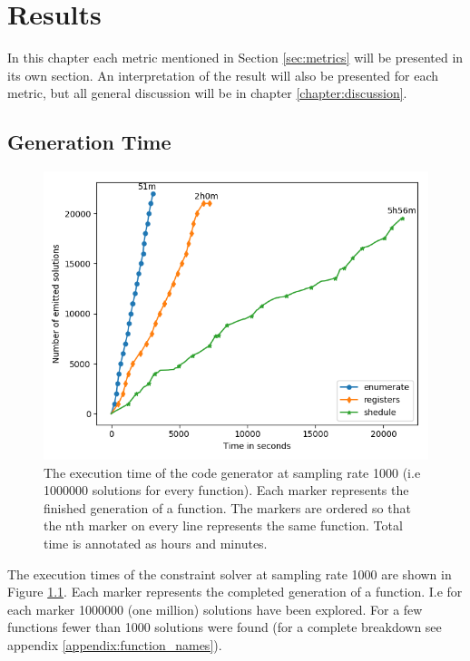 \chapter{Results}

In this chapter each metric mentioned in Section \ref{sec:metrics} will be presented in
its own section. An interpretation of the result will also be presented for each
metric, but all general discussion will be in chapter \ref{chapter:discussion}.

\section{Generation Time}

\begin{figure}[h]
	\centering
	\includegraphics[width=\textwidth,height=0.5\textheight]{results/figures/generator_time}
	\caption{The execution time of the code generator at sampling rate 1000 (i.e 1000000 solutions for every function). Each marker represents the finished generation of a function. The markers are ordered so that the nth marker on every line represents the same function. Total time is annotated as hours and minutes.}
	\label{fig:time}
\end{figure}

The execution times of the constraint solver at sampling rate 1000 are shown in Figure
\ref{fig:time}. Each marker represents the completed generation of a function. I.e for each
marker 1000000 (one million) solutions have been explored. For a few functions fewer than
1000 solutions were found (for a complete breakdown see appendix \ref{appendix:function_names}).

